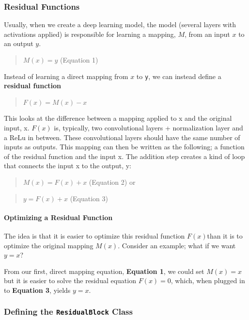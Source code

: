 \subsubsection{Residual Functions}
Usually, when we create a deep learning model, the model (several layers
with activations applied) is responsible for learning a mapping,
\(M\), from an input \(x\)
to an output \(y\).
\begin{quote}
    \(M(x) = y\) (Equation 1)
\end{quote}

Instead of learning a direct mapping from \(x\) to
\lstinline{y}, we can instead define a \textbf{residual function}
\begin{quote}
    \(F(x) = M(x) - x\)
\end{quote}

This looks at the difference between a mapping applied to x and the
original input, x. \(F(x)\) is, typically, two
convolutional layers + normalization layer and a ReLu in between. These
convolutional layers should have the same number of inputs as outputs.
This mapping can then be written as the following; a function of the
residual function and the input x. The addition step creates a kind of
loop that connects the input x to the output, y:
\begin{quote}
    \(M(x) = F(x) + x\) (Equation 2) or
\end{quote}
\begin{quote}
\(y = F(x) + x\) (Equation 3)
\end{quote}

\paragraph{Optimizing a Residual Function}
The idea is that it is easier to optimize this residual function
\(F(x)\)than it is to optimize the original
mapping \(M(x)\). Consider an example; what if we
want \(y = x\)? \newline

From our first, direct mapping equation, \textbf{Equation 1}, we could
set \(M(x) = x\) but it is easier to solve the
residual equation \(F(x) = 0\), which, when
plugged in to \textbf{Equation 3}, yields
\(y = x\).
\subsubsection{\texorpdfstring{Defining the \texttt{ResidualBlock} Class}{Defining the ResidualBlock Class}}

